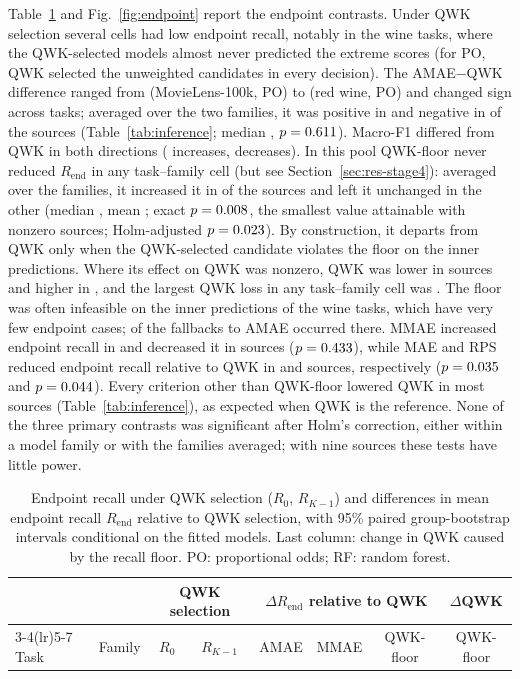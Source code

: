 \documentclass[pdflatex,sn-mathphys-ay]{sn-jnl}
\theoremstyle{thmstyleone}
\theoremstyle{thmstylethree}
\newcommand{\QWKF}{QWK-floor}
\begin{document}
Table~\ref{tab:endpoint} and Fig.~\ref{fig:endpoint} report the endpoint contrasts. Under QWK selection several cells had low endpoint recall, notably in the wine tasks, where the QWK-selected models almost never predicted the extreme scores (for PO, QWK selected the unweighted candidates in every decision). The AMAE$-$QWK difference ranged from \AmaeMin{} (MovieLens-100k, PO) to \AmaeMax{} (red wine, PO) and changed sign across tasks; averaged over the two families, it was positive in \WilPosAmae{} and negative in \WilNegAmae{} of the \NBlocks{} sources (Table~\ref{tab:inference}; median \WilMedAmae{}, $p=0.611$). Macro-F1 differed from QWK in both directions (\WilPosMfone{} increases, \WilNegMfone{} decreases). In this pool \QWKF{} never reduced $R_{\mathrm{end}}$ in any task--family cell (but see Section~\ref{sec:res-stage4}): averaged over the families, it increased it in \WilPosCon{} of the \NBlocks{} sources and left it unchanged in the other \ConZero{} (median \WilMedCon{}, mean \WilMeanCon{}; exact $p=0.008$, the smallest value attainable with \ConNonzero{} nonzero sources; Holm-adjusted $p=0.023$). By construction, it departs from QWK only when the QWK-selected candidate violates the floor on the inner predictions. Where its effect on QWK was nonzero, QWK was lower in \QwkCostNegCon{} sources and higher in \QwkCostPosCon{}, and the largest QWK loss in any task--family cell was \ConQwkCostMaxAbs{}. The floor was often infeasible on the inner predictions of the wine tasks, which have very few endpoint cases; \ConFallbacksWine{} of the \ConFallbacks{} fallbacks to AMAE occurred there. MMAE increased endpoint recall in \WilPosMmae{} and decreased it in \WilNegMmae{} sources ($p=0.433$), while MAE and RPS reduced endpoint recall relative to QWK in \WilNegMae{} and \WilNegRps{} sources, respectively ($p=0.035$ and $p=0.044$). Every criterion other than \QWKF{} lowered QWK in most sources (Table~\ref{tab:inference}), as expected when QWK is the reference. None of the three primary contrasts was significant after Holm's correction, either within a model family or with the families averaged; with nine sources these tests have little power.

\begin{table}[t]
\caption{Endpoint recall under QWK selection ($R_0$, $R_{K-1}$) and differences in mean endpoint recall $R_{\mathrm{end}}$ relative to QWK selection, with 95\% paired group-bootstrap intervals conditional on the fitted models. Last column: change in QWK caused by the recall floor. PO: proportional odds; RF: random forest.}\label{tab:endpoint}
\centering\scriptsize
\setlength{\tabcolsep}{3pt}
\begin{tabular}{@{}llcccccc@{}}
\toprule
& & \multicolumn{2}{c}{QWK selection} & \multicolumn{3}{c}{$\Delta R_{\mathrm{end}}$ relative to QWK} & $\Delta$QWK\\
\cmidrule(lr){3-4}\cmidrule(lr){5-7}
Task & Family & $R_0$ & $R_{K-1}$ & AMAE & MMAE & \QWKF{} & \QWKF{}\\
\midrule

\bottomrule
\end{tabular}
\end{table}
\end{document}
